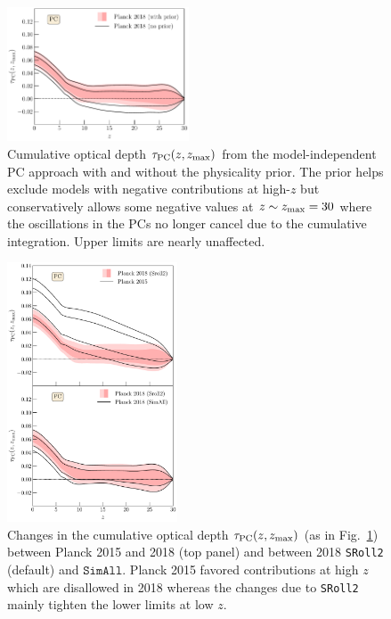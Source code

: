 \documentclass[aps,prd,twocolumn,amsmath,amssymb,showpacs,floatfix,superscriptaddress,nofootinbib]{revtex4-1}
\newcommand{\zmax}{z_{\rm max}}
\begin{document}
{\begin{figure}[ht]
\includegraphics[width=0.48\textwidth]{pl18_taugtz_pc_zmax30_pl18_srollv2_with_and_without_physicality_prior_do_rescale_tau_false.pdf}
\caption{Cumulative optical depth $\tau_{\rm PC}(z, \zmax)$ from the model-independent PC approach with and without the physicality prior.   The prior helps exclude models with negative contributions at high-$z$ but conservatively allows some negative values at $z \sim z_{\rm max}=30$ where the oscillations in the PCs no longer cancel due to the cumulative integration.  Upper limits are nearly unaffected. 
}
\label{fig:plot_taugtz_2018_with_vs_without_physicality_prior}
\end{figure}


\begin{figure}[ht]
\includegraphics[width=0.45\textwidth]{pl18_taugtz_pc_zmax30_pl15_vs_pl18_simallEE_vs_pl18_srollv2_do_rescale_tau_false.pdf}
\caption{Changes in the
cumulative optical depth $\tau_{\rm PC}(z, \zmax)$ (as in Fig.~\ref{fig:plot_taugtz_2018_with_vs_without_physicality_prior}) 
between Planck 2015 and 2018 (top panel) and between 2018 \texttt{SRoll2} (default) and $\texttt{SimAll}$.  Planck 2015 favored contributions at high $z$ which are disallowed in 2018 whereas the changes due to \texttt{SRoll2} mainly tighten the lower limits at low $z$.
}
\label{fig:plot_taugtz_2015_vs_2018_simallEE_vs_2018_srollv2}
\end{figure}


}
\end{document}
